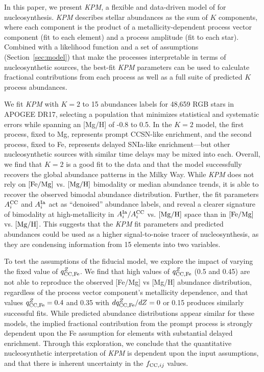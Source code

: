\documentclass[modern]{aastex631}
\newcommand{\femg}{[{\rm Fe}/{\rm Mg}]}
\newcommand{\mgh}{[{\rm Mg}/{\rm H}]}
\newcommand{\qccFe}{q_{{\rm CC, Fe}}^{Z}}
\newcommand{\dqccFe}{dq_{{\rm CC, Fe}}^{Z}/dZ}
\newcommand{\Acc}{A^{\rm CC}_{i}}
\newcommand{\AIa}{A^{\rm Ia}_{i}}
\newcommand{\fcc}{f_{{\rm CC}, ij}}
\newcommand{\name}{\textsl{KPM}}
\begin{document}
In this paper, we present \name{}, a flexible and data-driven model of for nucleosynthesis. \name{} describes stellar abundances as the sum of $K$ components, where each component is the product of a metallicity-dependent process vector component (fit to each element) and a process amplitude (fit to each star).    Combined with a likelihood function and a set of assumptions (Section~\ref{sec:model}) that make the processes interpretable in terms of nucleosynthetic sources, the best-fit \name{} parameters can be used to calculate fractional contributions from each process as well as a full suite of predicted $K$ process abundances. 

We fit \name{} with $K=2$ to 15 abundances labels for 48,659 RGB stars in APOGEE DR17, selecting a population that minimizes statistical and systematic errors while spanning an [Mg/H] of -0.8 to 0.5. In the $K=2$ model, the first process, fixed to Mg, represents prompt CCSN-like enrichment, and the second process, fixed to Fe, represents delayed SNIa-like enrichment---but other nucleosynthetic sources with similar time delays may be mixed into each. Overall, we find that $K=2$ is a good fit to the data and that the model successfully recovers the global abundance patterns in the Milky Way. While \name{} does not rely on $\femg$ vs. $\mgh$ bimodality or median abundance trends, it is able to recover the observed bimodal abundance distribution. Further, the fit parameters $\Acc$ and $\AIa$ act as ``denoised'' abundance labels, and reveal a clearer signature of bimodality at high-metallicity in $\AIa/\Acc$ vs. $\mgh$ space than in $\femg$ vs. $\mgh$. This suggests that the \name{} fit parameters and predicted abundances could be used as a higher signal-to-noise tracer of nucleosynthesis, as they are condensing information from 15 elements into two variables. 

To test the assumptions of the fiducial model, we explore the impact of varying the fixed value of $\qccFe$. We find that high values of $\qccFe$ (0.5 and 0.45) are not able to reproduce the observed [Fe/Mg] vs [Mg/H] abundance distribution, regardless of the process vector component's metallicity dependence, and that values $\qccFe = 0.4$ and 0.35 with $\dqccFe = 0$ or 0.15 produces similarly successful fits. While predicted abundance distributions appear similar for these models, the implied fractional contribution from the prompt process is strongly dependent upon the Fe assumption for elements with substantial delayed enrichment. Through this exploration, we conclude that the quantitative nucleosynthetic interpretation of \name{} is dependent upon the input assumptions, and that there is inherent uncertainty in the $\fcc$ values. 
\end{document}
